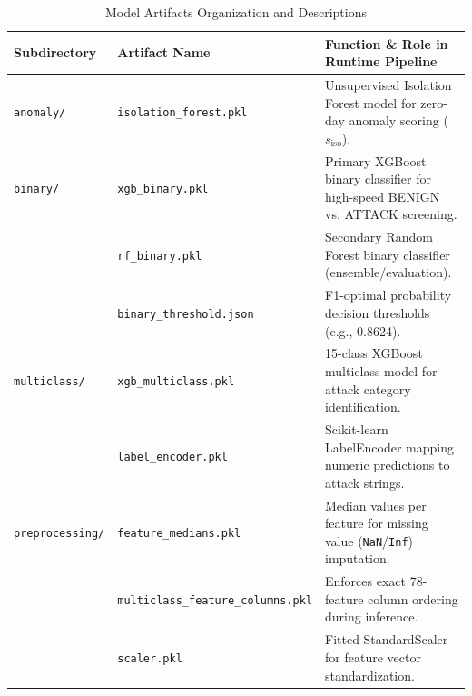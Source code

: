 \documentclass[12pt,a4paper]{article}
\begin{document}
\begin{table}[H]
\centering
\caption{Model Artifacts Organization and Descriptions}
\label{tab:model_artifacts}
\begin{tabular}{|l|l|p{7cm}|}
\hline
\textbf{Subdirectory} & \textbf{Artifact Name} & \textbf{Function \& Role in Runtime Pipeline} \\
\hline
\texttt{anomaly/} & \texttt{isolation\_forest.pkl} & Unsupervised Isolation Forest model for zero-day anomaly scoring ($s_{\text{iso}}$). \\
\hline
\texttt{binary/} & \texttt{xgb\_binary.pkl} & Primary XGBoost binary classifier for high-speed BENIGN vs. ATTACK screening. \\
 & \texttt{rf_binary.pkl} & Secondary Random Forest binary classifier (ensemble/evaluation). \\
 & \texttt{binary\_threshold.json} & F1-optimal probability decision thresholds (e.g., 0.8624). \\
\hline
\texttt{multiclass/} & \texttt{xgb\_multiclass.pkl} & 15-class XGBoost multiclass model for attack category identification. \\
 & \texttt{label\_encoder.pkl} & Scikit-learn LabelEncoder mapping numeric predictions to attack strings. \\
\hline
\texttt{preprocessing/} & \texttt{feature\_medians.pkl} & Median values per feature for missing value (\texttt{NaN}/\texttt{Inf}) imputation. \\
 & \texttt{multiclass\_feature\_columns.pkl} & Enforces exact 78-feature column ordering during inference. \\
 & \texttt{scaler.pkl} & Fitted StandardScaler for feature vector standardization. \\
\hline
\end{tabular}
\end{table}
\end{document}
